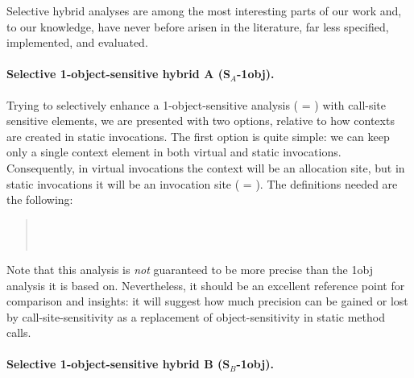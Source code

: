Selective hybrid analyses are among the most interesting parts of our
work and, to our knowledge, have never before arisen in the
literature, far less specified, implemented, and evaluated.



\paragraph{Selective 1-object-sensitive hybrid A (S$_A$-1obj).}

Trying to selectively enhance a 1-object-sensitive analysis (
= \args{\{$\star$\}}) with call-site sensitive elements, we are
presented with two options, relative to how contexts are created in
static invocations. The first option is quite simple: we can keep only
a single context element in both virtual and static
invocations. Consequently, in virtual invocations the context will be
an allocation site, but in static invocations it will be an invocation
site ( = ). The definitions needed are the
following:
\begin{quote}
 \\
 \\
\end{quote}
Note that this analysis is \emph{not} guaranteed to be more precise
than the 1obj analysis it is based on. Nevertheless, it should be an
excellent reference point for comparison and insights: it will suggest
how much precision can be gained or lost by call-site-sensitivity as a
replacement of object-sensitivity in static method calls.

\paragraph{Selective 1-object-sensitive hybrid B (S$_B$-1obj).}

